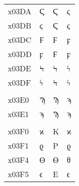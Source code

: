 \documentclass[a4paper]{article}
\newcommand*{\Greek}{\foreignlanguage{greek}}
\newcommand*{\Greek}{\ensuregreek}
\newcommand*{\Cases}[1]{%
  & \Greek{#1} & \Greek{\MakeUppercase{#1}} & \Greek{\MakeLowercase{#1}}
}
\begin{document}
\begin{longtable}{llll}
  x03DA \Cases{ Ϛ \textStigma{}                                                                                                   }\\
  x03DB \Cases{ ϛ \textstigma{}                                                                                                   }\\
  x03DC \Cases{ Ϝ \textDigamma{}                                                                                                  }\\
  x03DD \Cases{ ϝ \textdigamma{}                                                                                                  }\\
  x03DE \Cases{ Ϟ \textKoppa{}                                                                                                    }\\
  x03DF \Cases{ ϟ \textkoppa{}                                                                                                    }\\
                                                                                                                                   \\
  x03E0 \Cases{ Ϡ \textSampi{}                                                                                                    }\\
  x03E1 \Cases{ ϡ \textsampi{}                                                                                                    }\\
                                                                                                                                   \\
  x03F0 \Cases{ ϰ \textkappasymbol{}                \textvarkappa{}                                                               }\\
  x03F1 \Cases{ ϱ \textrhosymbol{}                  \textvarrho{}                                                                 }\\
  x03F4 \Cases{ ϴ \textThetasymbol{}                                                                                              }\\
  x03F5 \Cases{ ϵ \textepsilonsymbol{}                                                                                            }\\
\end{longtable}


\end{document}

